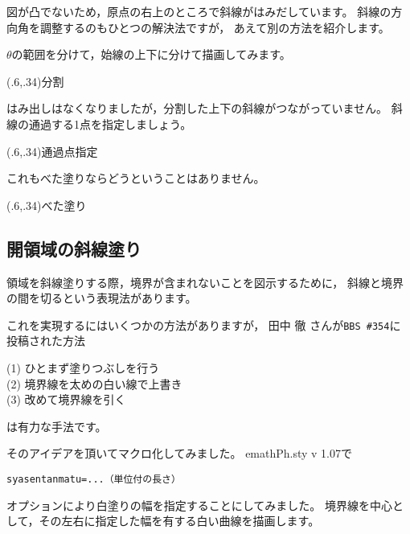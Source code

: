 図が凸でないため，原点の右上のところで斜線がはみだしています。
斜線の方向角を調整するのもひとつの解決法ですが，
あえて別の方法を紹介します。

$\theta$の範囲を分けて，始線の上下に分けて描画してみます。

\begin{showEx}(.6,.34){分割}
\end{showEx}

はみ出しはなくなりましたが，分割した上下の斜線がつながっていません。
斜線の通過する1点を指定しましょう。

\begin{showEx}(.6,.34){通過点指定}
\end{showEx}

これもべた塗りならどうということはありません。

\begin{showEx}(.6,.34){べた塗り}
\end{showEx}

\subsection{開領域の斜線塗り}
領域を斜線塗りする際，境界が含まれないことを図示するために，
斜線と境界の間を切るという表現法があります。

これを実現するにはいくつかの方法がありますが，
田中 徹 さんが\verb+BBS #354+に投稿された方法
\begin{jquote}\relax
(1) ひとまず塗りつぶしを行う\\
(2) 境界線を太めの白い線で上書き\\
(3) 改めて境界線を引く
\end{jquote}
は有力な手法です。

そのアイデアを頂いてマクロ化してみました。
\textsf{emathPh.sty v 1.07}で
\begin{jquote}
\begin{verbatim}
syasentanmatu=...（単位付の長さ）
\end{verbatim}
\end{jquote}
オプションにより白塗りの幅を指定することにしてみました。
境界線を中心として，その左右に指定した幅を有する白い曲線を描画します。

